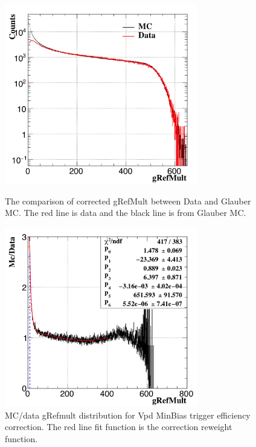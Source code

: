 \documentclass[a4paper]{article}
\begin{document}
\begin{figure}[htbp]
\begin{minipage}[htbp]{0.52\linewidth}
\centering
\includegraphics[width=0.75\textwidth]{fig/MB30_Mc_compare.png}
\caption{The comparison of corrected gRefMult between Data and Glauber MC. The red line is data and the black line is from Glauber MC.\label{fig:McData}}
\end{minipage}
\hfill
\begin{minipage}[htbp]{0.52\linewidth}
\centering
\includegraphics[width=0.75\textwidth]{fig/MB30_Mc_reweight.png} 
\caption{MC/data gRefmult distribution for Vpd MinBias trigger efficiency correction. The red line fit function is the correction reweight function.\label{fig:vpdEffWeight}}
\end{minipage}
\end{figure}
\end{document}
